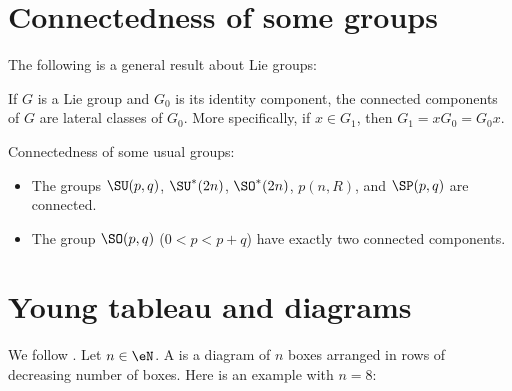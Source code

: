 
\section{Connectedness of some groups}

The following is a general result about Lie groups:
\begin{lemma} \label{LemConnSpecMo}
If $G$ is a Lie group and $G_0$ is its identity component, the connected components of $G$ are lateral classes of $G_0$. More specifically, if $x\in G_1$, then $G_1=xG_0=G_0x$.
\end{lemma}

\begin{lemma}   \label{LemOHjzfsL}
Connectedness of some usual groups:
\begin{itemize}
\item
    The groups $\SU(p, q)$, $\SU^*(2n)$, $\SO^*(2n)$, $p(n, R)$, and $\SP(p, q)$ are connected.
\item
    The group $\SO(p, q)$ ($0<p<p+q$) have exactly two connected components.
\end{itemize}
\end{lemma}

					\section{Young tableau and diagrams}

We follow \cite{ModavePoincarre}. Let $n\in \eN$. A  is a diagram of $n$ boxes arranged in rows of decreasing number of boxes. Here is an example with $n=8$:
%	

